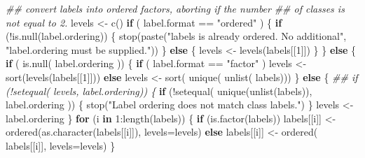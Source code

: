 \documentclass[
  letterpaper,
  DIV=11,
  numbers=noendperiod]{scrartcl}
\newenvironment{Shaded}{\begin{snugshade}}{\end{snugshade}}
\newcommand{\AttributeTok}[1]{\textcolor[rgb]{0.40,0.45,0.13}{#1}}
\newcommand{\ControlFlowTok}[1]{\textcolor[rgb]{0.00,0.23,0.31}{\textbf{#1}}}
\newcommand{\DecValTok}[1]{\textcolor[rgb]{0.68,0.00,0.00}{#1}}
\newcommand{\DocumentationTok}[1]{\textcolor[rgb]{0.37,0.37,0.37}{\textit{#1}}}
\newcommand{\FunctionTok}[1]{\textcolor[rgb]{0.28,0.35,0.67}{#1}}
\newcommand{\NormalTok}[1]{\textcolor[rgb]{0.00,0.23,0.31}{#1}}
\newcommand{\OtherTok}[1]{\textcolor[rgb]{0.00,0.23,0.31}{#1}}
\newcommand{\SpecialCharTok}[1]{\textcolor[rgb]{0.37,0.37,0.37}{#1}}
\newcommand{\StringTok}[1]{\textcolor[rgb]{0.13,0.47,0.30}{#1}}
\begin{document}
\begin{Shaded}
\begin{Highlighting}[]
    \DocumentationTok{\#\# convert \textquotesingle{}labels\textquotesingle{} into ordered factors, aborting if the number}
    \DocumentationTok{\#\# of classes is not equal to 2.}
\NormalTok{    levels }\OtherTok{\textless{}{-}} \FunctionTok{c}\NormalTok{()}
    \ControlFlowTok{if}\NormalTok{ ( label.format }\SpecialCharTok{==} \StringTok{"ordered"}\NormalTok{ ) \{}
        \ControlFlowTok{if}\NormalTok{ (}\SpecialCharTok{!}\FunctionTok{is.null}\NormalTok{(label.ordering)) \{}
            \FunctionTok{stop}\NormalTok{(}\FunctionTok{paste}\NormalTok{(}\StringTok{"\textquotesingle{}labels\textquotesingle{} is already ordered. No additional"}\NormalTok{,}
                       \StringTok{"\textquotesingle{}label.ordering\textquotesingle{} must be supplied."}\NormalTok{))}
\NormalTok{        \} }\ControlFlowTok{else}\NormalTok{ \{}
\NormalTok{            levels }\OtherTok{\textless{}{-}} \FunctionTok{levels}\NormalTok{(labels[[}\DecValTok{1}\NormalTok{]])}
\NormalTok{        \}}
\NormalTok{    \} }\ControlFlowTok{else}\NormalTok{ \{}
        \ControlFlowTok{if}\NormalTok{ ( }\FunctionTok{is.null}\NormalTok{( label.ordering )) \{}
            \ControlFlowTok{if}\NormalTok{ ( label.format }\SpecialCharTok{==} \StringTok{"factor"}\NormalTok{ ) levels }\OtherTok{\textless{}{-}} \FunctionTok{sort}\NormalTok{(}\FunctionTok{levels}\NormalTok{(labels[[}\DecValTok{1}\NormalTok{]]))}
            \ControlFlowTok{else}\NormalTok{ levels }\OtherTok{\textless{}{-}} \FunctionTok{sort}\NormalTok{( }\FunctionTok{unique}\NormalTok{( }\FunctionTok{unlist}\NormalTok{( labels)))}
\NormalTok{        \} }\ControlFlowTok{else}\NormalTok{ \{}
          \DocumentationTok{\#\# if (!setequal( levels, label.ordering)) \{}
          \ControlFlowTok{if}\NormalTok{ (}\SpecialCharTok{!}\FunctionTok{setequal}\NormalTok{( }\FunctionTok{unique}\NormalTok{(}\FunctionTok{unlist}\NormalTok{(labels)), label.ordering )) \{}
            \FunctionTok{stop}\NormalTok{(}\StringTok{"Label ordering does not match class labels."}\NormalTok{)}
\NormalTok{          \}}
\NormalTok{          levels }\OtherTok{\textless{}{-}}\NormalTok{ label.ordering}
\NormalTok{        \}}
        \ControlFlowTok{for}\NormalTok{ (i }\ControlFlowTok{in} \DecValTok{1}\SpecialCharTok{:}\FunctionTok{length}\NormalTok{(labels)) \{}
            \ControlFlowTok{if}\NormalTok{ (}\FunctionTok{is.factor}\NormalTok{(labels))}
\NormalTok{              labels[[i]] }\OtherTok{\textless{}{-}} \FunctionTok{ordered}\NormalTok{(}\FunctionTok{as.character}\NormalTok{(labels[[i]]),}
                                     \AttributeTok{levels=}\NormalTok{levels)}
            \ControlFlowTok{else}\NormalTok{ labels[[i]] }\OtherTok{\textless{}{-}} \FunctionTok{ordered}\NormalTok{( labels[[i]], }\AttributeTok{levels=}\NormalTok{levels)}
\NormalTok{        \}}


\end{Highlighting}
\end{Shaded}
\end{document}
